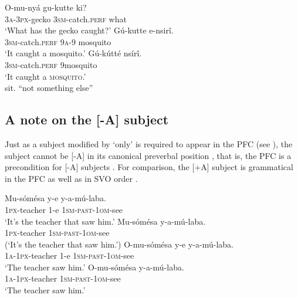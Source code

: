 \documentclass[output=paper]{langsci/langscibook}
\begin{document}
\ea\label{ex:vanderwal:33}
\ea\label{ex:vanderwal:33a}
\gll     O-mu-nyá    gu-kutte    ki?\\
         \textsc{3a}-\textsc{3px}-gecko  \textsc{3sm}-catch.\textsc{perf}  what\\
\glt     ‘What has the gecko caught?’
\ex\label{ex:vanderwal:33b}
\gll    Gú-kutte    e-nsirî.\\
         \textsc{3sm}-catch.\textsc{perf}  \textsc{9a}-9 mosquito\\
\glt     ‘It caught a mosquito.’
\ex\label{ex:vanderwal:33c}
\gll    Gú-kútté    nsírî.\\
         \textsc{3sm}-catch.\textsc{perf}  9mosquito\\
\glt ‘It caught a \textsc{mosquito}.’\\
sit. “not something else”
\z
\z

\subsection{A note on the [-A] subject}\label{sec:vanderwal:4.6} %

Just as a subject modified by ‘only’ is required to appear in the PFC (see ), the subject cannot be [-A] in its canonical preverbal position , that is, the PFC is a precondition for [-A] subjects . For comparison, the [+A] subject is grammatical in the PFC  as well as in SVO order .

\ea\label{ex:vanderwal:34}
\ea\label{ex:vanderwal:34a}
\gll   Mu-sómésa  y-e  y-a-mú-laba.\\
         \textsc{1px}-teacher  1-e  \textsc{1sm}-\textsc{past}-\textsc{1om}-see\\
\glt     ‘It’s the teacher that saw him.’
\ex\label{ex:vanderwal:34b}
\gll      *Mu-sómésa  y-a-mú-laba.\\
         \textsc{1px}-teacher  \textsc{1sm}-\textsc{past}-\textsc{1om}-see\\
\glt     (‘It’s the teacher that saw him.’)
\ex\label{ex:vanderwal:34c}
\gll    O-mu-sómésa  y-e  y-a-mú-laba.\\
         \textsc{1a}-\textsc{1px}-teacher  1-e  \textsc{1sm}-\textsc{past}-\textsc{1om}-see\\
\glt     ‘The teacher saw him.’
\ex\label{ex:vanderwal:34d}
\gll   O-mu-sómésa  y-a-mú-laba.\\
         \textsc{1a}-\textsc{1px}-teacher  \textsc{1sm}-\textsc{past}-\textsc{1om}-see\\
\glt     ‘The teacher saw him.’
\z
\z
\end{document}
